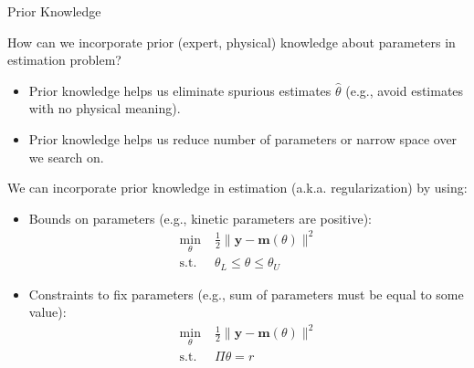 \documentclass[9pt]{beamer}
\begin{document}
%
\begin{frame}{Prior Knowledge}

\begin{block}{}
How can we incorporate prior (expert, physical) knowledge about parameters in  estimation problem? 
\end{block}
\begin{itemize}
\setlength{\itemsep}{5pt}
\item Prior knowledge helps us eliminate spurious estimates $\hat{\theta}$ (e.g., avoid estimates with no physical meaning). 
\item Prior knowledge helps us reduce number of parameters or narrow space over we search on.
\end{itemize}
We can incorporate prior knowledge in estimation (a.k.a. regularization) by using: 
\begin{itemize}
\item Bounds on parameters (e.g., kinetic parameters are positive):
\begin{align*}
\min_{\theta}& \; \frac{1}{2}\|\mathbf{y}- \mathbf{m}(\theta)\|^2\\ 
\textrm{s.t.}&\; \theta_L\leq \theta\leq\theta_U 
\end{align*}
\item Constraints to fix parameters (e.g., sum of parameters must be equal to some value):
\begin{align*}
\min_{\theta}& \; \frac{1}{2}\|\mathbf{y}- \mathbf{m}(\theta)\|^2\\ 
\textrm{s.t.}&\; \Pi \theta = r
\end{align*}

\end{itemize}
\end{frame}
\end{document}
